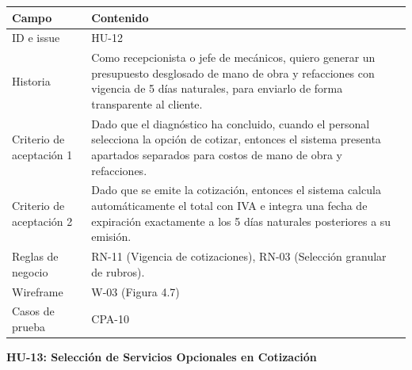 {\def\LTcaptype{none} %
\begin{longtable}[]{@{}
  >{\raggedright\arraybackslash}p{}
  >{\raggedright\arraybackslash}p{}@{}}
\toprule\noalign{}
\begin{minipage}[b]{\linewidth}\raggedright
\textbf{Campo}
\end{minipage} & \begin{minipage}[b]{\linewidth}\raggedright
\textbf{Contenido}
\end{minipage} \\
\midrule\noalign{}
\endhead
\bottomrule\noalign{}
\endlastfoot
ID e issue & HU-12 \\
Historia & Como recepcionista o jefe de mecánicos, quiero generar un
presupuesto desglosado de mano de obra y refacciones con vigencia de 5
días naturales, para enviarlo de forma transparente al cliente. \\
Criterio de aceptación 1 & Dado que el diagnóstico ha concluido, cuando
el personal selecciona la opción de cotizar, entonces el sistema
presenta apartados separados para costos de mano de obra y
refacciones. \\
Criterio de aceptación 2 & Dado que se emite la cotización, entonces el
sistema calcula automáticamente el total con IVA e integra una fecha de
expiración exactamente a los 5 días naturales posteriores a su
emisión. \\
Reglas de negocio & RN-11 (Vigencia de cotizaciones), RN-03 (Selección
granular de rubros). \\
Wireframe & W-03 (Figura 4.7) \\
Casos de prueba & CPA-10 \\
\end{longtable}
}

\textbf{HU-13: Selección de Servicios Opcionales en Cotización}

